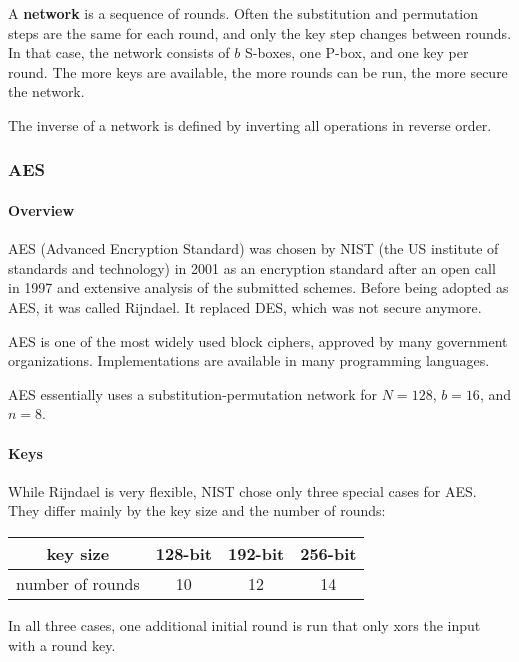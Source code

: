 A \textbf{network} is a sequence of rounds.
Often the substitution and permutation steps are the same for each round, and only the key step changes between rounds.
In that case, the network consists of $b$ S-boxes, one P-box, and one key per round.
The more keys are available, the more rounds can be run, the more secure the network.

The inverse of a network is defined by inverting all operations in reverse order.


\subsubsection{AES}

\paragraph{Overview}
AES (Advanced Encryption Standard) was chosen by NIST (the US institute of standards and technology) in 2001 as an encryption standard after an open call in 1997 and extensive analysis of the submitted schemes.
Before being adopted as AES, it was called Rijndael.
It replaced DES, which was not secure anymore.

AES is one of the most widely used block ciphers, approved by many government organizations.
Implementations are available in many programming languages.

AES essentially uses a substitution-permutation network for $N=128$, $b=16$, and $n=8$.

\paragraph{Keys}
While Rijndael is very flexible, NIST chose only three special cases for AES.
They differ mainly by the key size and the number of rounds:
\begin{center}
  \begin{tabular}{|c|c|c|c|}
  	\hline key size & 128-bit & 192-bit & 256-bit \\ 
  	\hline number of rounds & 10 & 12 & 14 \\ 
  	\hline
  \end{tabular}
\end{center}
In all three cases, one additional initial round is run that only xors the input with a round key.

